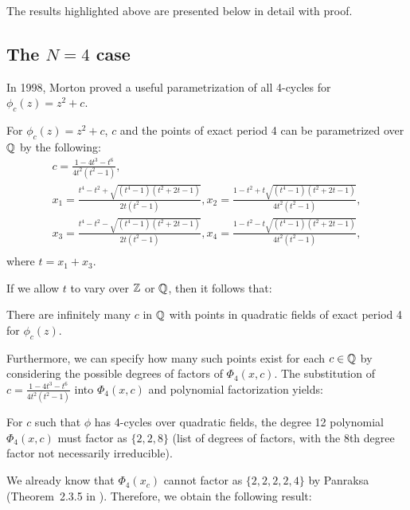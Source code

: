 The results highlighted above are presented below in detail with
proof.

\subsection{The $N = 4$ case}

In 1998, Morton proved a useful parametrization of all 4-cycles for
$\phi_c(z) = z^2 + c$.

\begin{theorem} 
	For $\phi_c(z) = z^2 + c$, $c$ and the points of exact period 4
	can be parametrized over $\mathbb{Q}$ by the following:
	\[
	\begin{gathered}
		c = \frac{1 - 4t^3 - t^6}{4t^2(t^2 - 1)}, \\
		x_1 = \frac{t^4 - t^2 + \sqrt{(t^4 - 1)(t^2 + 2t - 1)}}{2t(t^2 - 1)},
		x_2	= \frac{1 - t^2 + t \sqrt{(t^4 - 1)(t^2 + 2t - 1)}}{4t^2(t^2 - 1)}, \\
		x_3 = \frac{t^4 - t^2 - \sqrt{(t^4 - 1)(t^2 + 2t - 1)}}{2t(t^2 - 1)},
		x_4 = \frac{1 - t^2 - t \sqrt{(t^4 - 1)(t^2 + 2t - 1)}}{4t^2(t^2 - 1)}, \\
	\end{gathered}
	\]
	where $t = x_1 + x_3$.
\end{theorem}

If we allow $t$ to vary over $\mathbb{Z}$ or $\mathbb{Q}$, then it follows that:

\begin{corollary}
	There are infinitely many $c$ in $\mathbb{Q}$ with points in quadratic
	fields of exact period 4 for $\phi_c(z)$.
\end{corollary}

Furthermore, we can specify how many such points exist for each $c
\in \mathbb{Q}$ by considering the possible degrees of factors of $\Phi_4(
x,c)$. The substitution of $c = \frac{1 - 4t^3 - t^6}{4t^2(t^2 - 1)}$
into $\Phi_4(x,c)$ and polynomial factorization yields:

\begin{lemma}
	For $c$ such that $\phi$ has 4-cycles over quadratic fields,
	the degree 12 polynomial $\Phi_4(x,c)$ must factor as $\{2,2,8\}$
	(list of degrees of factors, with the 8th degree factor not
	necessarily irreducible).
\end{lemma}

We already know that $\Phi_4(x_c)$ cannot factor as $\{2,2,2,2,4\}$
by Panraksa (Theorem~2.3.5 in \cite{MR2982105}). Therefore, we
obtain the following result:

